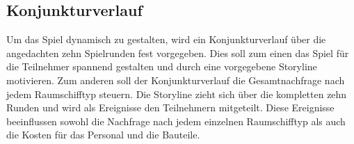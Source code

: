 \subsection{Konjunkturverlauf}
\label{sec:spielwelt-szenario-konjunkturverlauf}

Um das Spiel dynamisch zu gestalten, wird ein Konjunkturverlauf über die angedachten zehn Spielrunden fest vorgegeben. Dies soll zum einen das Spiel für die Teilnehmer spannend gestalten und durch eine vorgegebene Storyline motivieren. Zum anderen soll der Konjunkturverlauf die Gesamtnachfrage nach jedem Raumschifftyp steuern. Die Storyline zieht sich über die kompletten zehn Runden und wird als Ereignisse den Teilnehmern mitgeteilt. Diese Ereignisse beeinflussen sowohl die Nachfrage nach jedem einzelnen Raumschifftyp als auch die Kosten für das Personal und die Bauteile.